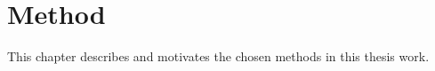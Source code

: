 \chapter{Method}\label{method}
This chapter describes and motivates the chosen methods in this thesis work.








